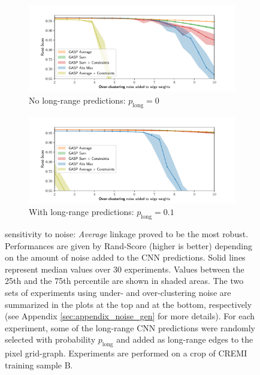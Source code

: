 \begin{figure}
        \begin{subfigure}[t]{0.46 \textwidth}
        \centering
        \includegraphics[width=\textwidth,trim=0.53in 0.1in 0.65in 0.45in,clip]{./figs/noise_plots/over_segment_plots_0.pdf}
        \caption{No long-range predictions: $p_{\mathrm{long}}=0$} \label{fig:merge_noise_only_direct}
    \end{subfigure} \hfill
    \begin{subfigure}[t]{0.46 \textwidth}
        \centering
        \includegraphics[width=\textwidth,trim=0.53in 0.1in 0.65in 0.45in,clip]{./figs/noise_plots/over_segment_plots_1.pdf}
        \caption{With long-range predictions: $p_{\mathrm{long}}=0.1$} \label{fig:merge_noise_with_long_range}
    \end{subfigure}
\caption{\algname{} sensitivity to noise: \emph{Average} linkage proved to be the most robust. Performances are given by Rand-Score (higher is better) depending on the amount of noise added to the CNN predictions. Solid lines represent median values over 30 experiments. Values between the 25th and the 75th percentile are shown in shaded areas. The two sets of experiments using under- and over-clustering noise are summarized in the plots at the top and at the bottom, respectively (see Appendix \ref{sec:appendix_noise_gen} for more details). For each experiment, some of the long-range CNN predictions were randomly selected with probability $p_{\mathrm{long}}$ and added as long-range edges to the pixel grid-graph. Experiments are performed on a crop of CREMI training sample B.
}\label{fig:noise_plots}
\end{figure}
